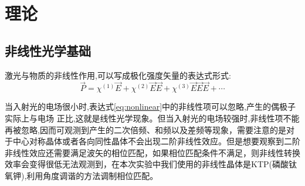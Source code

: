 \documentclass[aps,pre,12pt,preprint,%
	onecolumn,showpacs,showkeys,nofootinbib]{revtex4-2}
\begin{document}
\section{理论}
\subsection{非线性光学基础}
激光与物质的非线性作用,可以写成极化强度矢量的表达式形式:
\begin{equation}
    \label{eq:nonlinear}
    \vec{P} = \chi^{(1)}\vec{E} + \chi^{(2)}\vec{E}\vec{E} +
    \chi^{(3)}\vec{E}\vec{E}\vec{E} + \cdots
\end{equation}
\par 当入射光的电场很小时,表达式\ref{eq:nonlinear}中的非线性项可以忽略,产生的偶极子实际上与电场
正比,这就是线性光学现象。但当入射光的电场较强时,非线性项不能再被忽略,因而可观测到产生的二次倍频、和频以及差频等现象，需要注意的是对于中心对称晶体或者各向同性晶体不会出现二阶非线性效应。但是想要观察到二阶非线性效应还需要满足波矢的相位匹配，如果相位匹配条件不满足，则非线性转换效率会变得很低无法观测到，在本次实验中我们使用的非线性晶体是KTP(磷酸钛氧钾),利用角度调谐的方法调制相位匹配。
\end{document}

